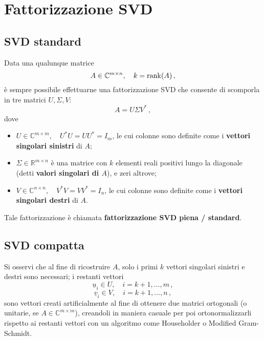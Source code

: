 \chapter{Fattorizzazione SVD}

\section{SVD standard}
Data una qualunque matrice
\begin{equation*}  
A \in \mathbb{C}^{m \times n},\quad k = \operatorname{rank}(A) \,,
\end{equation*}
è sempre possibile effettuarne una fattorizzazione SVD che consente di scomporla 
in tre matrici $U, \Sigma, V$:
\begin{equation}\label{SVD_standard}
A = U \Sigma V^* \,,
\end{equation}
dove
\begin{itemize}
	\item $U \in \mathbb{C}^{m \times m},\quad U^*U = UU^*=I_{m}$, le cui colonne 
sono
	definite come i \textbf{vettori singolari sinistri} di $A$;
	
	\item $\Sigma \in \mathbb{R}^{m\times n}$ è una matrice con $k$ elementi reali
	positivi lungo la diagonale (detti \textbf{valori singolari di $A$}), e zeri 
altrove;
	
	\item $V \in \mathbb{C}^{n \times n}, \quad V^*V = VV^*=I_{n}$, le cui colonne 
sono
	definite come i \textbf{vettori singolari destri} di $A$.
\end{itemize}  

Tale fattorizzazione è chiamata \textbf{fattorizzazione SVD piena / standard}.

\newpage
\section{SVD compatta}
Si osservi che al fine di ricostruire $A$, solo i primi $k$ vettori singolari 
sinistri e destri sono necessari; i restanti vettori
\begin{equation*}
	\underline{u}_{i} \in U, \quad i = k+1, \ldots, m \,,
\end{equation*}
\begin{equation*}
	\underline{v}_{i} \in V, \quad i = k+1, \ldots, n \,,
\end{equation*}
sono vettori creati artificialmente al fine di ottenere due matrici ortogonali 
(o unitarie, se $A \in \mathbb{C}^{m \times m}$), creandoli in maniera casuale 
per poi ortonormalizzarli rispetto ai restanti vettori con un algoritmo come 
Householder o Modified Gram-Schmidt.

